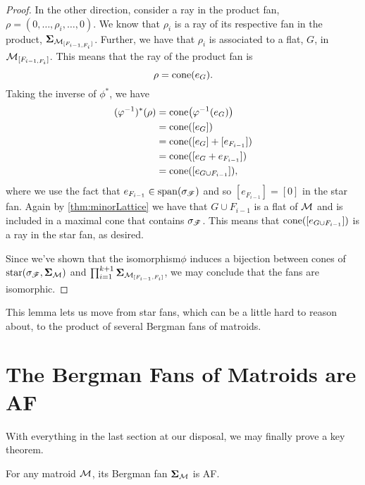 \documentclass[12pt,oneside]{../../sfsuthesis}
\begin{document}
\begin{proof}
    In the other direction, consider a ray in the product fan, \(\rho = (0, \dots, \rho_i, \dots, 0) \).
    We know that \( \rho_i \) is a ray of its respective fan in the product, \( \bm{\Sigma}_{\mathcal{M}_{[F_{i-1, F_i}]}}\).
    Further, we have that \( \rho_i \) is associated to a flat, \( G \), in \( \mathcal{M}_{[F_{i-1, F_i}]} \).
    This means that the ray of the product fan is
    \[
        \rho = \mathrm{cone}( e_{G} ).
    \]
    Taking the inverse of \( \phi^\ast \), we have
    \begin{align*}
        (\varphi^{-1})^\ast (\rho) & = \mathrm{cone}\big(\varphi^{-1}(e_G)\big) \\
                                & = \mathrm{cone}([e_G])                  \\
                                & = \mathrm{cone}([e_G] + [e_{F_{i-1}}])  \\
                                & = \mathrm{cone}([e_G + e_{F_{i-1}}])    \\
                                & = \mathrm{cone}([e_{G \cup F_{i-1}}]),
    \end{align*}
    where we use the fact that \( e_{F_{i-1}} \in \operatorname{span}(\sigma_{\mathscr{F}}) \) and so \(  [e_{F_{i-1}}] = [0] \) in the star fan.
    Again by \th\ref{thm:minorLattice} we have that \( G \cup F_{i-1} \) is a flat of \( \mathcal{M} \) and is included in a maximal cone that contains \( \sigma_{\mathscr{F}} \).
    This means that \( \mathrm{cone}([e_{G \cup F_{i-1}}]) \) is a ray in the star fan, as desired.

    Since we've shown that the isomorphism\( \phi \) induces a bijection between cones of \( \operatorname{star}(\sigma_{\mathscr{F}}, \bm{\Sigma}_{\mathcal{M}}) \) and \( \prod_{i=1}^{k+1} \bm{\Sigma}_{\mathcal{M}_{[F_{i-1}, F_i]}} \),
    we may conclude that the fans are isomorphic.
\end{proof}

This lemma lets us move from star fans, which can be a little hard to reason about, to the product of several Bergman fans of matroids.

\section{The Bergman Fans of Matroids are AF}

With everything in the last section at our disposal, we may finally prove a key theorem.
\begin{theorem}\th\label{thm:matroidAF}
    For any matroid \( \mathcal{M} \), its Bergman fan \( \bm{\Sigma}_{\mathcal{M}} \) is AF.
\end{theorem}
\end{document}
